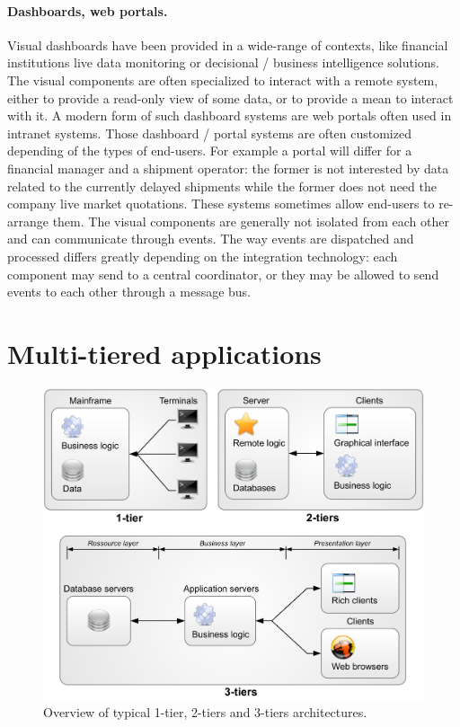 \paragraph{Dashboards, web portals.}
Visual dashboards have been provided in a wide-range of contexts, like financial institutions live data monitoring or decisional / business intelligence solutions. The visual components are often specialized to interact with a remote system, either to provide a read-only view of some data, or to provide a mean to interact with it. A modern form of such dashboard systems are web portals often used in intranet systems. Those dashboard / portal systems are often customized depending of the types of end-users. For example a portal will differ for a financial manager and a shipment operator: the former is not interested by data related to the currently delayed shipments while the former does not need the company live market quotations. These systems sometimes allow end-users to re-arrange them. The visual components are generally not isolated from each other and can communicate through events. The way events are dispatched and processed differs greatly depending on the integration technology: each component may send to a central coordinator, or they may be allowed to send events to each other through a message bus.\\


\section{Multi-tiered applications}


\begin{figure}[htbp]
    \centering
    \includegraphics[width=\textwidth]{content/web-services/123-tiers}
    \caption{Overview of typical 1-tier, 2-tiers and 3-tiers architectures.}
    \label{fig:123-tiers}
\end{figure}

